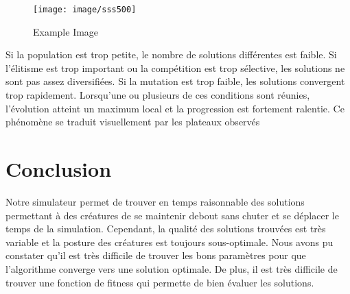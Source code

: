 \documentclass[journal, a4paper]{IEEEtran}
\begin{document}
	\begin{figure}
	  \texttt{[image: image/sss500]}
	  \caption{Example Image}
	  \label{fig:sss500}
	\end{figure}
Si la population est trop petite, le nombre de solutions différentes
est faible.
Si l'élitisme est trop important ou la compétition est trop sélective,
les solutions
ne sont pas assez diversifiées.
Si la mutation est trop faible, les solutions convergent trop rapidement.
Lorsqu'une ou plusieurs de ces conditions sont réunies, l'évolution
atteint un maximum local et la progression est fortement ralentie.
Ce phénomène se traduit visuellement par les plateaux observés



\section{Conclusion}\label{sec:conclusion}
	Notre simulateur permet de trouver en temps raisonnable des
	solutions permettant à des créatures de se maintenir debout sans
	chuter et	se déplacer le temps de la simulation.
	Cependant, la qualité des solutions trouvées est très variable et
	la posture des créatures est toujours sous-optimale.
	Nous avons pu constater qu'il est très difficile
	de trouver les bons paramètres pour que l'algorithme converge
	vers une solution optimale. De plus, il est très difficile
	de trouver une fonction de fitness qui permette de bien
	évaluer les solutions.
\end{document}
